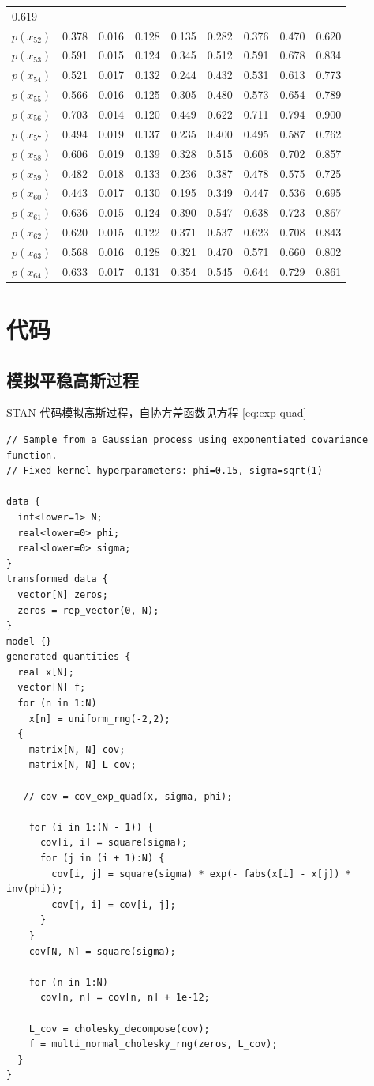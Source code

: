 \documentclass[12pt,a4paper,UTF8,twoside]{book}
\theoremstyle{definition}
\theoremstyle{definition}
\theoremstyle{definition}
\theoremstyle{remark}
\begin{document}
\begin{longtable}[]{@{}lrrrrrrrr@{}}
0.619\tabularnewline
\(p(x_{52})\) & 0.378 & 0.016 & 0.128 & 0.135 & 0.282 & 0.376 & 0.470 &
0.620\tabularnewline
\(p(x_{53})\) & 0.591 & 0.015 & 0.124 & 0.345 & 0.512 & 0.591 & 0.678 &
0.834\tabularnewline
\(p(x_{54})\) & 0.521 & 0.017 & 0.132 & 0.244 & 0.432 & 0.531 & 0.613 &
0.773\tabularnewline
\(p(x_{55})\) & 0.566 & 0.016 & 0.125 & 0.305 & 0.480 & 0.573 & 0.654 &
0.789\tabularnewline
\(p(x_{56})\) & 0.703 & 0.014 & 0.120 & 0.449 & 0.622 & 0.711 & 0.794 &
0.900\tabularnewline
\(p(x_{57})\) & 0.494 & 0.019 & 0.137 & 0.235 & 0.400 & 0.495 & 0.587 &
0.762\tabularnewline
\(p(x_{58})\) & 0.606 & 0.019 & 0.139 & 0.328 & 0.515 & 0.608 & 0.702 &
0.857\tabularnewline
\(p(x_{59})\) & 0.482 & 0.018 & 0.133 & 0.236 & 0.387 & 0.478 & 0.575 &
0.725\tabularnewline
\(p(x_{60})\) & 0.443 & 0.017 & 0.130 & 0.195 & 0.349 & 0.447 & 0.536 &
0.695\tabularnewline
\(p(x_{61})\) & 0.636 & 0.015 & 0.124 & 0.390 & 0.547 & 0.638 & 0.723 &
0.867\tabularnewline
\(p(x_{62})\) & 0.620 & 0.015 & 0.122 & 0.371 & 0.537 & 0.623 & 0.708 &
0.843\tabularnewline
\(p(x_{63})\) & 0.568 & 0.016 & 0.128 & 0.321 & 0.470 & 0.571 & 0.660 &
0.802\tabularnewline
\(p(x_{64})\) & 0.633 & 0.017 & 0.131 & 0.354 & 0.545 & 0.644 & 0.729 &
0.861\tabularnewline
\bottomrule
\end{longtable}

\hypertarget{simulate-code}{%
\section*{代码}\label{simulate-code}}

\hypertarget{simulate-SGP-code}{%
\subsection*{模拟平稳高斯过程}\label{simulate-SGP-code}}

STAN 代码模拟高斯过程，自协方差函数见方程 \ref{eq:exp-quad}

\begin{verbatim}
// Sample from a Gaussian process using exponentiated covariance function.
// Fixed kernel hyperparameters: phi=0.15, sigma=sqrt(1)

data {
  int<lower=1> N;
  real<lower=0> phi;
  real<lower=0> sigma;
}
transformed data {
  vector[N] zeros;
  zeros = rep_vector(0, N);
}
model {}
generated quantities {
  real x[N];
  vector[N] f;
  for (n in 1:N)
    x[n] = uniform_rng(-2,2);
  {
    matrix[N, N] cov;
    matrix[N, N] L_cov;
    
   // cov = cov_exp_quad(x, sigma, phi);

    for (i in 1:(N - 1)) {
      cov[i, i] = square(sigma);
      for (j in (i + 1):N) {
        cov[i, j] = square(sigma) * exp(- fabs(x[i] - x[j]) * inv(phi));
        cov[j, i] = cov[i, j];
      }
    }
    cov[N, N] = square(sigma); 
    
    for (n in 1:N)
      cov[n, n] = cov[n, n] + 1e-12;

    L_cov = cholesky_decompose(cov);
    f = multi_normal_cholesky_rng(zeros, L_cov);
  }
}
\end{verbatim}
\end{document}
